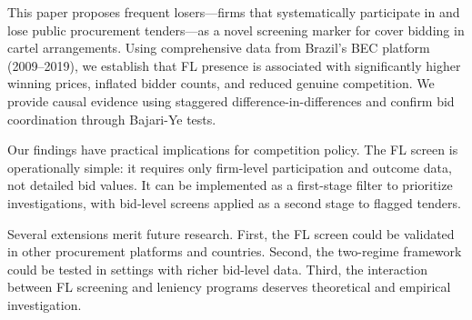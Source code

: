 \documentclass[10pt]{article}
\begin{document}
This paper proposes frequent losers---firms that systematically participate in and lose public procurement tenders---as a novel screening marker for cover bidding in cartel arrangements. Using comprehensive data from Brazil's BEC platform (2009--2019), we establish that FL presence is associated with significantly higher winning prices, inflated bidder counts, and reduced genuine competition. We provide causal evidence using staggered difference-in-differences and confirm bid coordination through Bajari-Ye tests.

Our findings have practical implications for competition policy. The FL screen is operationally simple: it requires only firm-level participation and outcome data, not detailed bid values. It can be implemented as a first-stage filter to prioritize investigations, with bid-level screens applied as a second stage to flagged tenders.

Several extensions merit future research. First, the FL screen could be validated in other procurement platforms and countries. Second, the two-regime framework could be tested in settings with richer bid-level data. Third, the interaction between FL screening and leniency programs deserves theoretical and empirical investigation.

\newpage
\printbibliography
\end{document}

